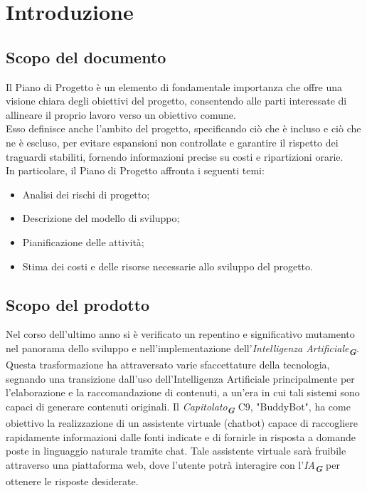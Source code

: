 

\section{Introduzione}
\label{sec:introduzione}

\subsection{Scopo del documento}
Il Piano di Progetto è un elemento di fondamentale importanza che offre una visione chiara degli obiettivi del progetto, 
consentendo alle parti interessate di allineare il proprio lavoro verso un obiettivo comune.\\
Esso definisce anche l'ambito del progetto, specificando ciò che è incluso e ciò che ne è escluso, per evitare espansioni 
non controllate e garantire il rispetto dei traguardi stabiliti, fornendo informazioni precise su costi e ripartizioni orarie.\\
In particolare, il Piano di Progetto affronta i seguenti temi:
\begin{itemize}
    \item Analisi dei rischi di progetto;
    \item Descrizione del modello di sviluppo;
    \item Pianificazione delle attività;
    \item Stima dei costi e delle risorse necessarie allo sviluppo del progetto.
\end{itemize}

\subsection{Scopo del prodotto}
Nel corso dell’ultimo anno si è verificato un repentino e significativo mutamento nel panorama dello sviluppo e nell’implementazione dell’\emph{Intelligenza Artificiale}\textsubscript{\textit{\textbf{G}}}. Questa trasformazione ha attraversato varie sfaccettature della tecnologia, segnando una transizione dall’uso dell’Intelligenza Artificiale principalmente per l’elaborazione e la raccomandazione di contenuti, a un’era in cui tali sistemi sono capaci di generare contenuti originali.
Il \emph{Capitolato}\textsubscript{\textit{\textbf{G}}} C9, "BuddyBot", ha come obiettivo la realizzazione di un assistente virtuale (chatbot) capace di raccogliere rapidamente informazioni dalle fonti indicate e di fornirle in risposta a domande poste in linguaggio naturale tramite chat.
Tale assistente virtuale sarà fruibile attraverso una piattaforma web, dove l’utente potrà interagire con l'\emph{IA}\textsubscript{\textit{\textbf{G}}} per ottenere le risposte desiderate.


